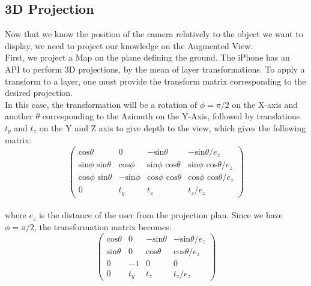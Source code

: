 \subsection{3D Projection}

Now that we know the position of the camera relatively to the object we want to display, we need to project our knowledge on the Augmented View.\\

First, we project a Map on the plane defining the ground. The iPhone has an API to perform 3D projections, by the mean of layer transformations. To apply a transform to a layer, one must provide the transform matrix corresponding to the desired projection.\\

In this case, the transformation will be a rotation of $\phi = \pi/2$ on the X-axis and another $\theta$ corresponding to the Azimuth on the Y-Axis, followed by translations $t_y$ and $t_z$ on the Y and Z axis to give depth to the view, which gives the following matrix:\\

\[ \left( \begin{array}{cccc}
	\textrm{cos} \theta 				& 0 					& -\textrm{sin} \theta 				& - \textrm{sin} \theta / e_z\\
	\textrm{sin} \phi \textrm{ sin} \theta 	& \textrm{cos} \phi		& \textrm{sin} \phi \textrm{ cos} \theta 	& \textrm{sin} \phi \textrm{ cos} \theta  / e_z\\
	\textrm{cos} \phi \textrm{ sin} \theta	& -\textrm{sin} \phi		& \textrm{cos} \phi \textrm{ cos} \theta	& \textrm{cos} \phi \textrm{ cos} \theta / e_z\\
	0							& t_y					& t_z 							& t_z / e_z
\end{array} \right)\]\\

where $e_z$ is the distance of the user from the projection plan. Since we have $\phi = \pi / 2$, the transformation matrix becomes: \\

\[ \left( \begin{array}{cccc}
	\textrm{cos} \theta	& 0 				& -\textrm{sin} \theta 	& - \textrm{sin} \theta / e_z\\
	\textrm{sin} \theta 	& 0				& \textrm{cos} \theta 		& \textrm{cos} \theta  / e_z\\
	0				& -1				& 0					& 0\\
	0				& t_y				& t_z 				& t_z / e_z
\end{array} \right)\]\\

